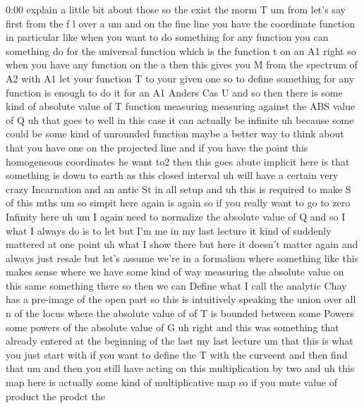 \begin{unfinished}{0:00}
explain  a  little  bit  about  those  so  the
exist  the
morm
T
um
from  let's  say  first  from  the  f  l  over  a
um  and  on  the  fine  line  you  have  the
coordinate
function  in  particular  like  when  you
want  to  do  something  for  any  function
you  can  something  do  for  the  universal
function  which  is  the  function  t  on  an
A1  right  so  when  you  have  any  function
on  the  a  then  this  gives  you  M
from  the  spectrum  of  A2  with  A1  let  your
function  T  to  your  given  one  so  to
define  something  for  any  function  is
enough  to  do  it  for  an  A1  Anders  Cas  U
and  so  then  there  is  some  kind  of
absolute  value  of  T
function
measuring  measuring  against  the  ABS
value  of  Q  uh  that  goes  to  well  in  this
case  it  can  actually  be
infinite
uh
because  some  could  be  some  kind  of
unrounded  function  maybe  a  better  way  to
think  about  that  you  have  one  on  the
projected
line  and  if  you  have  the
point  this  homogeneous  coordinates  he
want  to2  then  this  goes
abute
implicit  here  is  that  something  is  down
to  earth  as  this  closed  interval  uh  will
have  a  certain  very  crazy  Incarnation
and  an  antic  St  in  all  setup  and  uh  this
is  required  to  make  S  of  this  mths
um  so  simpit  here  again  is  again  so  if
you  really  want  to  go  to  zero  Infinity
here
uh
um  I  again  need  to  normalize  the
absolute  value  of  Q  and  so  I  what  I
always  do  is  to
let  but  I'm  me  in  my  last  lecture  it
kind  of  suddenly  mattered  at  one  point
uh  what  I  show  there  but  here  it  doesn't
matter  again  and  always  just
resale  but  let's  assume  we're  in  a
formalism  where  something  like  this
makes  sense  where  we  have  some  kind  of
way  measuring  the  absolute  value  on  this
same  something  there  so  then  we
can
Define  what  I  call  the  analytic
Chay  has  a
pre-image  of  the  open  part  so  this  is
intuitively
speaking
the  union  over  all  n  of  the  locus  where
the  absolute  value  of  of  T  is  bounded
between  some
Powers  some  powers  of  the  absolute  value
of
G
uh
right  and  this  was  something
that  already  entered  at  the  beginning  of
the  last  my  last  lecture  um  that  this  is
what  you  just  start  with  if  you  want  to
define  the  T  with  the
curveent  and  then  find
that
um  and  then  you  still  have  acting  on
this  multiplication  by
two
and  uh  this  map  here  is  actually  some
kind  of  multiplicative  map  so  if  you
mute  value  of  product  the  prodct  the

\end{unfinished}
